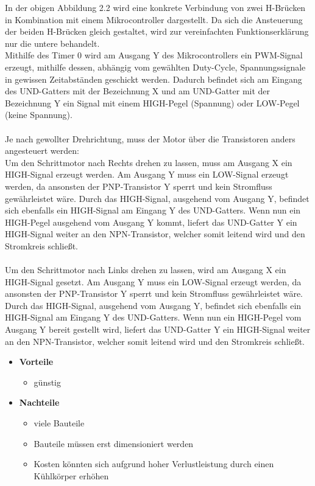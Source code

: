 In der obigen Abbildung 2.2 wird eine konkrete Verbindung von zwei H-Brücken in Kombination mit einem Mikrocontroller dargestellt.
Da sich die Ansteuerung der beiden H-Brücken gleich gestaltet, wird zur vereinfachten Funktionserklärung nur die untere behandelt. \\
Mithilfe des Timer 0 wird am Ausgang Y des Mikrocontrollers ein PWM-Signal erzeugt, mithilfe dessen, abhängig vom gewählten Duty-Cycle, Spannungssignale in gewissen Zeitabständen geschickt werden.
Dadurch befindet sich am Eingang des UND-Gatters mit der Bezeichnung X und am UND-Gatter mit der Bezeichnung Y ein Signal mit einem HIGH-Pegel (Spannung) oder LOW-Pegel (keine Spannung). \\\\
Je nach gewollter Drehrichtung, muss der Motor über die Transistoren anders angesteuert werden: \\
Um den Schrittmotor nach Rechts drehen zu lassen, muss am Ausgang X ein HIGH-Signal erzeugt werden.
Am Ausgang Y muss ein LOW-Signal erzeugt werden, da ansonsten der PNP-Transistor Y sperrt und kein Stromfluss gewährleistet wäre.
Durch das HIGH-Signal, ausgehend vom Ausgang Y, befindet sich ebenfalls ein HIGH-Signal am Eingang Y des UND-Gatters.
Wenn nun ein HIGH-Pegel ausgehend vom Ausgang Y kommt, liefert das UND-Gatter Y ein HIGH-Signal weiter an den NPN-Transistor, welcher somit leitend wird und den Stromkreis schließt. \\\\
Um den Schrittmotor nach Links drehen zu lassen, wird am Ausgang X ein HIGH-Signal gesetzt.
Am Ausgang Y muss ein LOW-Signal erzeugt werden, da ansonsten der PNP-Transistor Y sperrt und kein Stromfluss gewährleistet wäre.
Durch das HIGH-Signal, ausgehend vom Ausgang Y, befindet sich ebenfalls ein HIGH-Signal am Eingang Y des UND-Gatters.
Wenn nun ein HIGH-Pegel vom Ausgang Y bereit gestellt wird, liefert das UND-Gatter Y ein HIGH-Signal weiter an den NPN-Transistor, welcher somit leitend wird und den Stromkreis schließt.

\begin{itemize}
    \item \textbf{Vorteile}
    \begin{itemize}
        \item günstig
    \end{itemize}
    \item \textbf{Nachteile}
    \begin{itemize}
        \item viele Bauteile
        \item Bauteile müssen erst dimensioniert werden
        \item Kosten könnten sich aufgrund hoher Verlustleistung durch einen Kühlkörper erhöhen
    \end{itemize}
\end{itemize}

